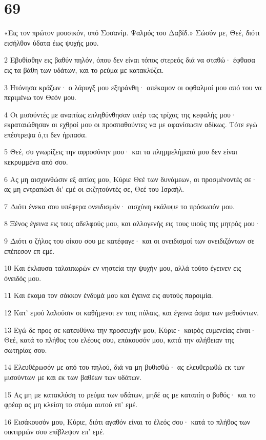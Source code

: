 \chapter{69}

\par «Εις τον πρώτον μουσικόν, υπό Σοσανίμ. Ψαλμός του Δαβίδ.» Σώσόν με, Θεέ, διότι εισήλθον ύδατα έως ψυχής μου.
\par 2 Εβυθίσθην εις βαθύν πηλόν, όπου δεν είναι τόπος στερεός διά να σταθώ· έφθασα εις τα βάθη των υδάτων, και το ρεύμα με κατακλύζει.
\par 3 Ητόνησα κράζων· ο λάρυγξ μου εξηράνθη· απέκαμον οι οφθαλμοί μου από του να περιμένω τον Θεόν μου.
\par 4 Οι μισούντές με αναιτίως επληθύνθησαν υπέρ τας τρίχας της κεφαλής μου· εκραταιώθησαν οι εχθροί μου οι προσπαθούντες να με αφανίσωσιν αδίκως. Τότε εγώ επέστρεψα ό,τι δεν ήρπασα.
\par 5 Θεέ, συ γνωρίζεις την αφροσύνην μου· και τα πλημμελήματά μου δεν είναι κεκρυμμένα από σου.
\par 6 Ας μη αισχυνθώσιν εξ αιτίας μου, Κύριε Θεέ των δυνάμεων, οι προσμένοντές σε· ας μη εντραπώσι δι' εμέ οι εκζητούντές σε, Θεέ του Ισραήλ.
\par 7 Διότι ένεκα σου υπέφερα ονειδισμόν· αισχύνη εκάλυψε το πρόσωπόν μου.
\par 8 Ξένος έγεινα εις τους αδελφούς μου, και αλλογενής εις τους υιούς της μητρός μου·
\par 9 Διότι ο ζήλος του οίκου σου με κατέφαγε· και οι ονειδισμοί των ονειδιζόντων σε επέπεσον επ εμέ.
\par 10 Και έκλαυσα ταλαιπωρών εν νηστεία την ψυχήν μου, αλλά τούτο έγεινεν εις όνειδός μου.
\par 11 Και έκαμα τον σάκκον ένδυμά μου και έγεινα εις αυτούς παροιμία.
\par 12 Κατ' εμού λαλούσιν οι καθήμενοι εν ταις πύλαις, και έγεινα άσμα των μεθυόντων.
\par 13 Εγώ δε προς σε κατευθύνω την προσευχήν μου, Κύριε· καιρός ευμενείας είναι· Θεέ, κατά το πλήθος του ελέους σου, επάκουσόν μου, κατά την αλήθειαν της σωτηρίας σου.
\par 14 Ελευθέρωσόν με από του πηλού, διά να μη βυθισθώ· ας ελευθερωθώ εκ των μισούντων με και εκ των βαθέων των υδάτων.
\par 15 Ας μη με κατακλύση το ρεύμα των υδάτων, μηδέ ας με καταπίη ο βυθός· και το φρέαρ ας μη κλείση το στόμα αυτού επ' εμέ.
\par 16 Εισάκουσόν μου, Κύριε, διότι αγαθόν είναι το έλεός σου· κατά το πλήθος των οικτιρμών σου επίβλεψον επ' εμέ.

